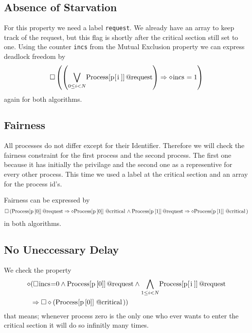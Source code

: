 \documentclass{llncs}
\begin{document}
\subsection{Absence of Starvation}

For this property we need a label \lstinline|request|. We already have an array to keep track of the request,
but this flag is shortly after the critical section still set to one.
Using the counter \lstinline|incs| from the Mutual Exclusion property we can express deadlock freedom by
\begin{equation}
    \square \left( \left( \underset{0\leq i < N}{\bigvee} \text{\lstinline|Process[p[i]]@request|}\right) \Rightarrow \diamond \text{\lstinline|incs|} = 1 \right)
\end{equation}
again for both algorithms.
\subsection{Fairness}

All processes do not differ except for their Identifier. Therefore we will check the fairness constraint for the first process and the second process.
The first one because it has initially the privilage and the second one as a representive for every other process.
This time we used a label at the critical section and an array for the process id's.

Fairness can be expressed by
\begin{equation}
    \square \left( \text{\lstinline|Process[p[0]]@request|} \Rightarrow \diamond \text{\lstinline|Process[p[0]]@critical|} 
    \land \text{\lstinline|Process[p[1]]@request|}\Rightarrow \diamond \text{\lstinline|Process[p[1]]@critical|}\right)
\end{equation}
in both algorithms.

\subsection{No Uneccessary Delay}

We check the property
\begin{eqnarray}
    \diamond & ( \square \text{\lstinline|incs|=0} \land \text{\lstinline|Process[p[0]]@request|} \land \underset{1\leq i < N}{\bigwedge} \text{\lstinline|Process[p[i]]@request|}\\
    &\Rightarrow \square \diamond(\text{\lstinline|Process[p[0]]@critical|}))
\end{eqnarray}
that means; whenever process zero is the only one who ever wants to enter the critical section it will do so infinitly many times.
\end{document}
